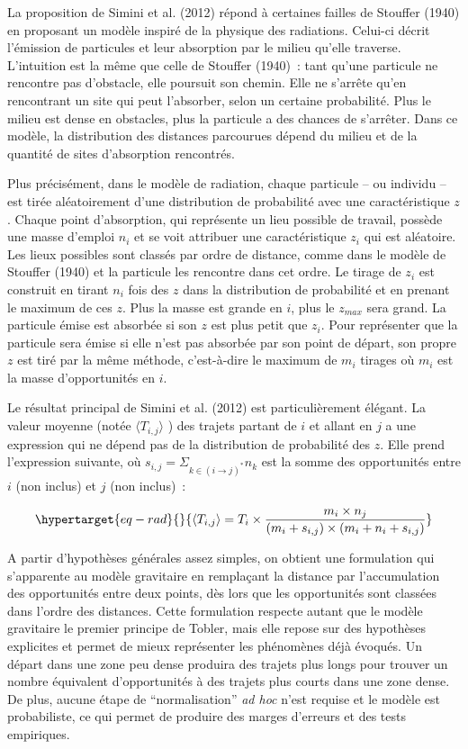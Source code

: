 \documentclass[
  10pt,
  a4paper,
  numbers=noendperiod,
  DIV=9]{scrartcl}
\begin{document}
La proposition de Simini et al. (2012) répond à certaines failles de
Stouffer (1940) en proposant un modèle inspiré de la physique des
radiations. Celui-ci décrit l'émission de particules et leur absorption
par le milieu qu'elle traverse. L'intuition est la même que celle de
Stouffer (1940)~: tant qu'une particule ne rencontre pas d'obstacle,
elle poursuit son chemin. Elle ne s'arrête qu'en rencontrant un site qui
peut l'absorber, selon un certaine probabilité. Plus le milieu est dense
en obstacles, plus la particule a des chances de s'arrêter. Dans ce
modèle, la distribution des distances parcourues dépend du milieu et de
la quantité de sites d'absorption rencontrés.

Plus précisément, dans le modèle de radiation, chaque particule -- ou
individu -- est tirée aléatoirement d'une distribution de probabilité
avec une caractéristique \(z\). Chaque point d'absorption, qui
représente un lieu possible de travail, possède une masse d'emploi
\(n_i\) et se voit attribuer une caractéristique \(z_i\) qui est
aléatoire. Les lieux possibles sont classés par ordre de distance, comme
dans le modèle de Stouffer (1940) et la particule les rencontre dans cet
ordre. Le tirage de \(z_i\) est construit en tirant \(n_i\) fois des
\(z\) dans la distribution de probabilité et en prenant le maximum de
ces \(z\). Plus la masse est grande en \(i\), plus le \(z_{max}\) sera
grand. La particule émise est absorbée si son \(z\) est plus petit que
\(z_i\). Pour représenter que la particule sera émise si elle n'est pas
absorbée par son point de départ, son propre \(z\) est tiré par la même
méthode, c'est-à-dire le maximum de \(m_i\) tirages où \(m_i\) est la
masse d'opportunités en \(i\).

Le résultat principal de Simini et al. (2012) est particulièrement
élégant. La valeur moyenne (notée \(\langle T_{i,j}\rangle\) ) des
trajets partant de \(i\) et allant en \(j\) a une expression qui ne
dépend pas de la distribution de probabilité des \(z\). Elle prend
l'expression suivante, où
\(s_{i,j}=\Sigma_{k \in (i \rightarrow j)^*} n_k\) est la somme des
opportunités entre \(i\) (non inclus) et \(j\) (non inclus)~:

\begin{equation}\protect\hypertarget{eq-rad}{}{
\langle T_{i,j}\rangle = T_i \times \frac {m_i \times n_j}{(m_i + s_{i,j}) \times (m_i + n_i +s_{i,j})}
}\label{eq-rad}\end{equation}

A partir d'hypothèses générales assez simples, on obtient une
formulation qui s'apparente au modèle gravitaire en remplaçant la
distance par l'accumulation des opportunités entre deux points, dès lors
que les opportunités sont classées dans l'ordre des distances. Cette
formulation respecte autant que le modèle gravitaire le premier principe
de Tobler, mais elle repose sur des hypothèses explicites et permet de
mieux représenter les phénomènes déjà évoqués. Un départ dans une zone
peu dense produira des trajets plus longs pour trouver un nombre
équivalent d'opportunités à des trajets plus courts dans une zone dense.
De plus, aucune étape de ``normalisation'' \emph{ad hoc} n'est requise
et le modèle est probabiliste, ce qui permet de produire des marges
d'erreurs et des tests empiriques.
\end{document}

